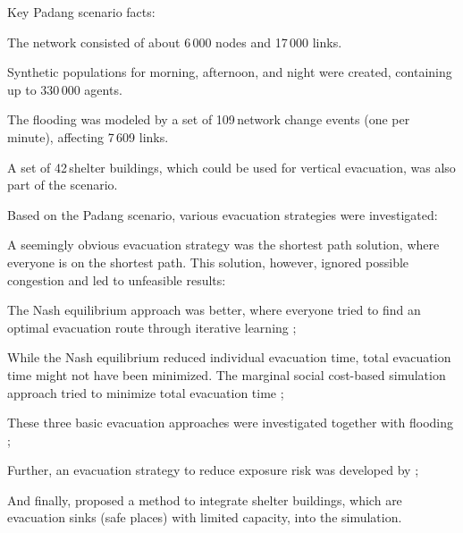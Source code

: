 Key Padang scenario facts:
\begin{compactitem}
\item The network consisted of about 6\,000 nodes and 17\,000 links.
\item Synthetic populations for morning, afternoon, and night were created, containing up to 330\,000 agents.
\item The flooding was modeled by a set of 109\,network change events (one per minute), affecting 7\,609 links.
\item A set of 42\,shelter buildings, which could be used for vertical evacuation, was also part of the scenario.
\end{compactitem}
Based on the Padang scenario, various evacuation strategies were investigated:
\begin{compactitem}
\item A seemingly obvious evacuation strategy was the shortest path solution, where everyone is on the shortest path. This solution, however, ignored possible congestion and led to unfeasible results:
\item The Nash equilibrium approach was better, where everyone tried to find an optimal evacuation route through iterative learning \citep{00LaemmelKluepfelNagel2009EvacPadangAtBookTimmermanns};
\item While the Nash equilibrium reduced individual evacuation time, total evacuation time might not have been minimized. The marginal social cost-based simulation approach tried to minimize total evacuation time \citep{00LaemmelFloetteroed2009KISysOptEvac,00DresslerFloetteroedLaemmelNagelSkutella2010OptimalEvacuationLargeScaleScenarios};
\item These three basic evacuation approaches were investigated together with flooding \citep{00LaemmelGretherNagel2009TimeDependentNetworks,Laemmel_PhDThesis_2011};
\item Further, an evacuation strategy to reduce exposure risk was developed by \citep{00LaemmelKluepfelNagel2010PEDRiskPrinted};
\item And finally, \citet{00FloetteroedLaemmel2010ICECShelterEvac} proposed a method to integrate shelter buildings, which are evacuation sinks (\ie safe places) 
with limited capacity, into the simulation.  
\end{compactitem}

